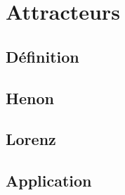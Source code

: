 %
%

\chapter{Attracteurs}
\section{Définition}
\section{Henon}
\section{Lorenz}
\section{Application}
